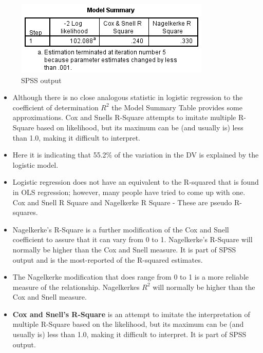 \documentclass[a4paper,12pt]{article}
\begin{document}
\begin{figure}[h!]
	\centering
	\includegraphics[width=0.9\linewidth]{images/BLogReg-Rsq}
	\caption{SPSS output}
	\label{fig:BLogReg-Rsq}
\end{figure}
\begin{itemize}
\item Although there is no close analogous statistic in logistic regression to
the coefficient of determination $R^2$ the Model Summary Table provides some approximations. Cox and Snells R-Square attempts to imitate multiple R-Square based on likelihood, but its maximum can be (and usually is) less than 1.0, making it difficult to interpret. 
\item Here it is indicating that 55.2\% of the variation in the DV is explained by the
logistic model. 
\item Logistic regression does not have an equivalent to the R-squared that is found in OLS regression; however, many people have tried to come up with one.  
Cox  and Snell R Square and Nagelkerke R Square - These are pseudo R-squares. 
\item 	Nagelkerke's R-Square is a further modification of the Cox and Snell coefficient to assure that it can vary from 0 to 1. Nagelkerke's R-Square will normally be higher than the Cox and Snell measure. It is part of SPSS output and is the most-reported of the R-squared estimates.

\item The Nagelkerke modification that does range from 0 to 1 is a more reliable
measure of the relationship. Nagelkerkes $R^2$ will normally be higher than the Cox and Snell measure.



\item \textbf{Cox and Snell's R-Square} is an attempt to imitate the interpretation of multiple R-Square based on the likelihood, but its maximum can be (and usually is) less than 1.0, making it difficult to interpret. It is part of SPSS output.
\end{itemize}
\end{document}

